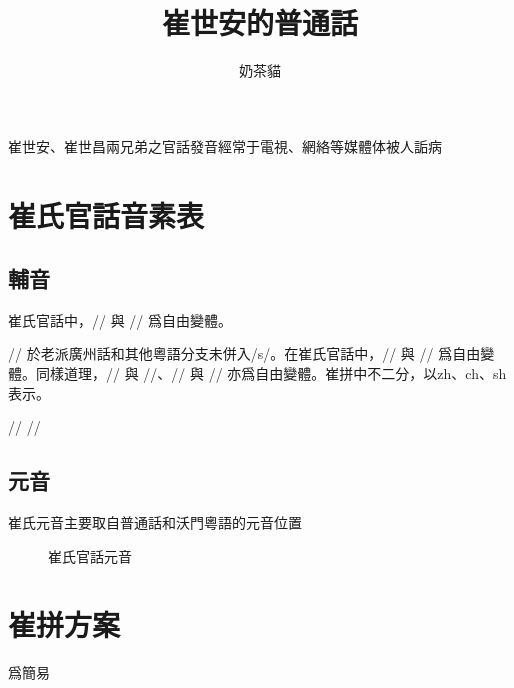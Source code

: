 \documentclass{ctexart}
\title{崔世安的普通話}
\author{奶茶貓}
\begin{document}
\maketitle
\tableofcontents

崔世安、崔世昌兩兄弟之官話發音經常于電視、網絡等媒體体被人詬病

\section{崔氏官話音素表}

\subsection{輔音}
崔氏官話中，/\textipa{\textctc}/ 與 // 爲自由變體。

// 於老派廣州話和其他粵語分支未併入/s/。在崔氏官話中，// 與 /\textipa{\textrtails}/ 爲自由變體。同樣道理，// 與 //、// 與 // 亦爲自由變體。崔拼中不二分，以zh、ch、sh表示。

/\textipa{\textrtailz}/ //

\subsection{元音}
崔氏元音主要取自普通話和沃門粵語的元音位置
\begin{figure}[h]
  \caption{崔氏官話元音}
    {\large\begin{vowel}
    \end{vowel}}
\end{figure}
\section{崔拼方案}

爲簡易
\end{document}
